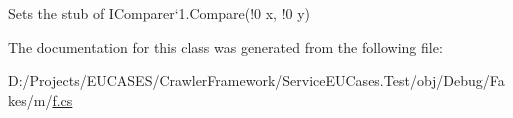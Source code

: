 Sets the stub of I\-Comparer`1.Compare(!0 x, !0 y)



The documentation for this class was generated from the following file\-:\begin{DoxyCompactItemize}
\item 
D\-:/\-Projects/\-E\-U\-C\-A\-S\-E\-S/\-Crawler\-Framework/\-Service\-E\-U\-Cases.\-Test/obj/\-Debug/\-Fakes/m/\hyperlink{m_2f_8cs}{f.\-cs}\end{DoxyCompactItemize}
